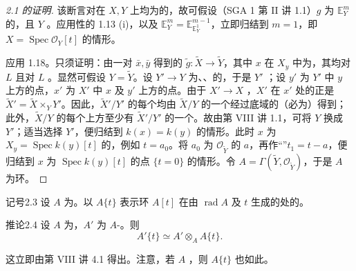 \begin{proof}[2.1 的证明]
该断言对在 $X,Y$ 上均为的，故可假设（SGA 1 第 II 讲 1.1）$g$ 为 $\mathbb E_Y^m$ 的，且 $Y$ 。应用性的 1.13 (i)，以及 $\mathbb E_Y^m=\mathbb E_{\mathbb E_Y^1}^{m-1}$，立即归结到 $m=1$，即 $X=\operatorname{Spec}\mathscr O_Y[t]$ 的情形。

应用 1.18。只须证明：由一对 $\bar x,\bar y$ 得到的 $\widetilde g:\widetilde X\to\widetilde Y$，其中 $x$ 在 $X_y$ 中为，其均对 $L$ 且对 $L$ 。显然可假设 $Y=\widetilde Y$。设 $Y'\to Y$ 为、、的，于是 $Y'$ ；设 $y'$ 为 $Y'$ 中 $y$ 上方的点，$x'$ 为 $X'$ 中 $x$ 及 $y'$ 上方的点。由于 $X'\to X$ ，$X'$ 在 $x'$ 处的正是 $\widetilde X'=\widetilde X\times_Y Y'$。因此，$\widetilde X'/Y'$ 的每个均由 $\widetilde X/Y$ 的一个经过底域的（必为）得到；此外，$\widetilde X/Y$ 的每个上方至少有 $\widetilde X'/Y'$ 的一个。故由第 VIII 讲 1.1，可将 $Y$ 换成 $Y'$；适当选择 $Y'$，便归结到 $k(x)=k(y)$ 的情形。此时 $x$ 为 $X_y=\operatorname{Spec}k(y)[t]$ 的，例如 $t=a_0$。将 $a_0$ 为 $\mathscr O_{\widetilde Y}$ 的 $a$，再作“”$t_1=t-a$，便归结到 $x$ 为 $\operatorname{Spec}k(y)[t]$ 的点 $\{t=0\}$ 的情形。令 $A=\Gamma(\widetilde Y,\mathscr O_{\widetilde Y})$，于是 $A$ 为环。
\end{proof}
\begin{SGAresult}{记号}{2.3}
设 $A$ 为。以 $A\{t\}$ 表示环 $A[t]$ 在由 $\operatorname{rad}A$ 及 $t$ 生成的处的。
\end{SGAresult}
\begin{SGAresult}{推论}{2.4}
设 $A$ 为，$A'$ 为 $A$-。则
\[A'\{t\}\simeq A'\otimes_A A\{t\}.\]
\end{SGAresult}
这立即由第 VIII 讲 4.1 得出。注意，若 $A$ ，则 $A\{t\}$ 也如此。

